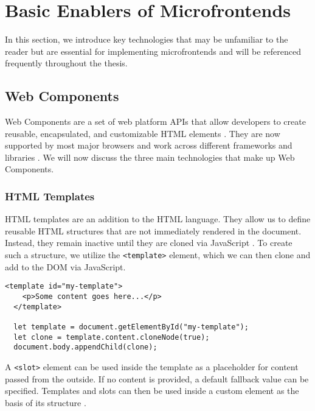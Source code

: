 \section{Basic Enablers of Microfrontends}
In this section, we introduce key technologies that may be unfamiliar to the reader but are essential for implementing microfrontends and will be referenced frequently throughout the thesis.

\subsection{Web Components}
Web Components are a set of web platform APIs that allow developers to create reusable, encapsulated, and customizable HTML elements \cite{MDNWebComponents}. They are now supported by most major browsers and work across different frameworks and libraries \cite{EisenbergWebComponents}. We will now discuss the three main technologies that make up Web Components.

\subsubsection{HTML Templates}
HTML templates are an addition to the HTML language. They allow us to define reusable HTML structures that are not immediately rendered in the document. Instead, they remain inactive until they are cloned via JavaScript \cite{MDNWebComponents}. To create such a structure, we utilize the \texttt{<template>} element, which we can then clone and add to the DOM via JavaScript.
\begin{lstlisting}[caption={Example of using HTML template element}]
  <template id="my-template">
    <p>Some content goes here...</p>
  </template>

  let template = document.getElementById("my-template");
  let clone = template.content.cloneNode(true);
  document.body.appendChild(clone);
\end{lstlisting}
A \texttt{<slot>} element can be used inside the template as a placeholder for content passed from the outside. If no content is provided, a default fallback value can be specified. Templates and slots can then be used inside a custom element as the basis of its structure \cite{MDNWebComponents}. 


